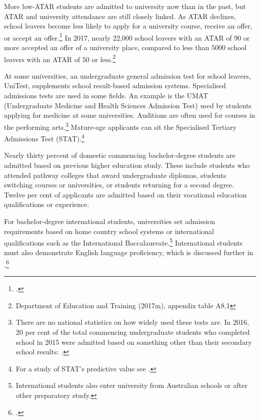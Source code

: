 \documentclass{grattan}
\begin{document}
More low-ATAR students are admitted to university now than in the past, but ATAR and university attendance are still closely linked. As ATAR declines, school leavers become less likely to apply for a university course, receive an offer, or accept an offer.\footcite[][8]{Norton2018droppingouttheb} In 2017, nearly 22,000 school leavers with an ATAR of 90 or more accepted an offer of a university place, compared to less than 5000 school leavers with an ATAR of 50 or less.\footnote{Department of Education and Training (2017m), appendix table A8,1}

At some universities, an undergraduate general admission test for school leavers, UniTest, supplements school result-based admission systems. Specialised admissions tests are used in some fields. An example is the UMAT (Undergraduate Medicine and Health Sciences Admission Test) used by students applying for medicine at some universities. Auditions are often used for courses in the performing arts.\footnote{There are no national statistics on how widely used these tests are. In 2016, 20 per cent of the total commencing undergraduate students who completed school in 2015 were admitted based on something other than their secondary school results: \textcite[][]{DepartmentofEducationandTraining2015highereducationst}.} Mature-age applicants can sit the Specialised Tertiary Admissions Test (STAT).\footnote{For a study of STAT's predictive value see \textcite[][]{Coates2010evaluationofthes}.}

Nearly thirty percent of domestic commencing bachelor-degree students are admitted based on previous higher education study. These include students who attended pathway colleges that award undergraduate diplomas, students switching courses or universities, or students returning for a second degree. Twelve per cent of applicants are admitted based on their vocational education qualifications or experience.

For bachelor-degree international students, universities set admission requirements based on home country school systems or international qualifications such as the International Baccalaureate.\footnote{International students also enter university from Australian schools or after other preparatory study.} International students must also demonstrate English language proficiency, which is discussed further in .\footcites[][chapter~2]{Arkoudis2012englishlanguagest}[][]{Muller2017englishtestforin}
\end{document}
